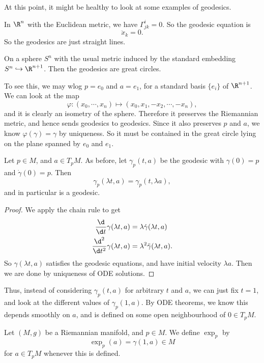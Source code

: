 \documentclass[a4paper]{article}
\begin{document}
At this point, it might be healthy to look at some examples of geodesics.
\begin{eg}
  In $\R^n$ with the Euclidean metric, we have $\Gamma^i_{jk} = 0$. So the geodesic equation is
  \[
    \ddot{x}_k = 0.
  \]
  So the geodesics are just straight lines.
\end{eg}

\begin{eg}
  On a sphere $S^n$ with the usual metric induced by the standard embedding $S^n \hookrightarrow \R^{n + 1}$. Then the geodesics are great circles.

  To see this, we may wlog $p = e_0$ and $a = e_1$, for a standard basis $\{e_i\}$ of $\R^{n + 1}$. We can look at the map
  \[
    \varphi: (x_0, \cdots, x_n) \mapsto (x_0, x_1, -x_2, \cdots, -x_n),
  \]
  and it is clearly an isometry of the sphere. Therefore it preserves the Riemannian metric, and hence sends geodesics to geodesics. Since it also preserves $p$ and $a$, we know $\varphi(\gamma) = \gamma$ by uniqueness. So it must be contained in the great circle lying on the plane spanned by $e_0$ and $e_1$.
\end{eg}

\begin{lemma}
  Let $p \in M$, and $a \in T_p M$. As before, let $\gamma_p(t, a)$ be the geodesic with $\gamma(0) = p$ and $\dot{\gamma}(0) = p$. Then
  \[
    \gamma_p(\lambda t, a) = \gamma_p(t, \lambda a),
  \]
  and in particular is a geodesic.
\end{lemma}

\begin{proof}
  We apply the chain rule to get
  \begin{align*}
    \frac{\d}{\d t} \gamma(\lambda t, a) &= \lambda \dot{\gamma} (\lambda t, a)\\
    \frac{\d^2}{\d t^2} \gamma(\lambda t, a) &= \lambda^2 \ddot{\gamma}(\lambda t, a).
  \end{align*}
  So $\gamma(\lambda t, a)$ satisfies the geodesic equations, and have initial velocity $\lambda a$. Then we are done by uniqueness of ODE solutions.
\end{proof}

Thus, instead of considering $\gamma_p(t, a)$ for arbitrary $t$ and $a$, we can just fix $t = 1$, and look at the different values of $\gamma_p(1, a)$. By ODE theorems, we know this depends smoothly on $a$, and is defined on some open neighbourhood of $0 \in T_p M$.

\begin{defi}
  Let $(M, g)$ be a Riemannian manifold, and $p \in M$. We define $\exp_p$ by
  \[
    \exp_p(a) = \gamma(1, a) \in M
  \]
  for $a \in T_p M$ whenever this is defined.
\end{defi}
\end{document}
